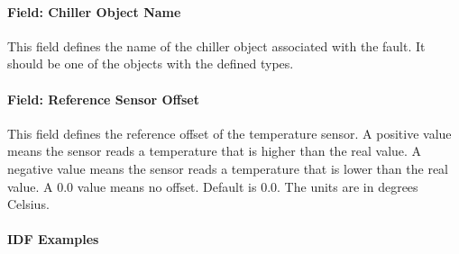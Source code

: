 \paragraph{Field: Chiller Object Name}

This field defines the name of the chiller object associated with the fault. It should be one of the objects with the defined types.

\paragraph{Field: Reference Sensor Offset}

This field defines the reference offset of the temperature sensor. A positive value means the sensor reads a temperature that is higher than the real value. A negative value means the sensor reads a temperature that is lower than the real value. A 0.0 value means no offset. Default is 0.0. The units are in degrees Celsius.

\paragraph{IDF Examples}

